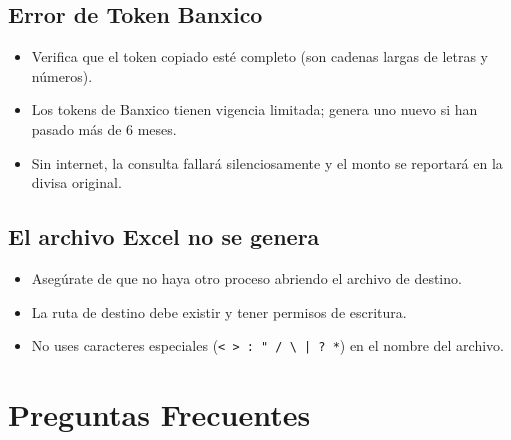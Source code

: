 \documentclass[12pt, a4paper, oneside]{report}
\begin{document}
\section{Error de Token Banxico}

\begin{itemize}
  \item Verifica que el token copiado esté completo (son cadenas largas
        de letras y números).
  \item Los tokens de Banxico tienen vigencia limitada; genera uno nuevo si
        han pasado más de 6 meses.
  \item Sin internet, la consulta fallará silenciosamente y el monto se
        reportará en la divisa original.
\end{itemize}

\section{El archivo Excel no se genera}

\begin{itemize}
  \item Asegúrate de que no haya otro proceso abriendo el archivo de destino.
  \item La ruta de destino debe existir y tener permisos de escritura.
  \item No uses caracteres especiales (\texttt{< > : " / \textbackslash{} | ? *})
        en el nombre del archivo.
\end{itemize}

\chapter{Preguntas Frecuentes}
\end{document}
